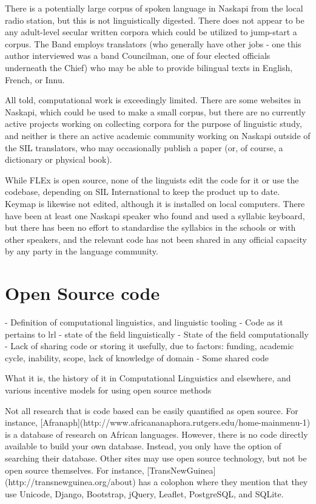 \documentclass[10pt, a4paper]{article}
\begin{document}
There is a potentially large corpus of spoken language in Naskapi from the local radio station, but this is not linguistically digested. There does not appear to be any adult-level secular written corpora which could be utilized to jump-start a corpus. The Band employs translators (who generally have other jobs - one this author interviewed was a band Councilman, one of four elected officials underneath the Chief) who may be able to provide bilingual texts in English, French, or Innu.

All told, computational work is exceedingly limited. There are some websites in Naskapi, which could be used to make a small corpus, but there are no currently active projects working on collecting corpora for the purpose of linguistic study, and neither is there an active academic community working on Naskapi outside of the SIL translators, who may occasionally publish a paper (or, of course, a dictionary or physical book).

While FLEx is open source, none of the linguists edit the code for it or use the codebase, depending on SIL International to keep the product up to date. Keymap is likewise not edited, although it is installed on local computers. There have been at least one Naskapi speaker who found and used a syllabic keyboard, but there has been no effort to standardise the syllabics in the schools or with other speakers, and the relevant code has not been shared in any official capacity by any party in the language community.

\section{Open Source code}


- Definition of computational linguistics, and linguistic tooling
- Code as it pertains to lrl
- state of the field linguistically
- State of the field computationally
- Lack of sharing code or storing it usefully, due to factors: funding, academic cycle, inability, scope, lack of knowledge of domain
- Some shared code


What it is, the history of it in Computational Linguistics and elsewhere, and various incentive models for using open source methods

Not all research that is code based can be easily quantified as open source. For instance, [Afranaph](http://www.africananaphora.rutgers.edu/home-mainmenu-1) is a database of research on African languages. However, there is no code directly available to build your own database. Instead, you only have the option of searching their database. Other sites may use open source technology, but not be open source themselves. For instance, [TransNewGuinea](http://transnewguinea.org/about) has a colophon where they mention that they use Unicode, Django, Bootstrap, jQuery, Leaflet, PostgreSQL, and SQLite.
\end{document}

